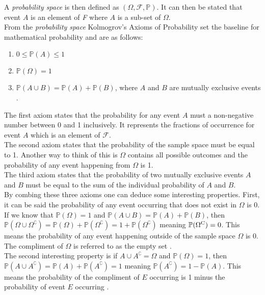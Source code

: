 \documentclass{article}
\begin{document}
A \textit{probability space} is then defined as $(\Omega, \mathcal{F}, \mathbb{P})$. It can then be stated that event $A$ is an element of \textit{F} where $A$ is a sub-set of $\Omega$. \\

From the \textit{probability space} Kolmogrov's Axioms of Probability set the baseline for mathematical probability and are as follows:

\begin{enumerate}
  \item $0 \leq \mathbb{P}(A) \leq 1$
  \item $\mathbb{P}(\Omega) = 1$
  \item $\mathbb{P}(A \cup B) = \mathbb{P}(A) + \mathbb{P}(B)$, where $A$ and $B$ are mutually exclusive events \parencite{Meyers2020}.
\end{enumerate}

The first axiom states that the probability for any event $A$ must a non-negative number between 0 and 1 inclusively. It represents the fractions of occurrence for event $A$ which is an element of $\mathcal{F}$. \\

The second axiom states that the probability of the sample space must be equal to 1. Another way to think of this is $\Omega$ contains all possible outcomes and the probability of any event happening from $\Omega$ is 1. \\

The third axiom states that the probability of two mutually exclusive events $A$ and $B$ must be equal to the sum of the individual probability of $A$ and $B$. \\

By combing these three axioms one can deduce some interesting properties. First, it can be said the probability of any event occurring that does not exist in $\Omega$ is 0. If we know that $\mathbb{P}(\Omega)=1$ and $\mathbb{P}(A \cup B) = \mathbb{P}(A) + \mathbb{P}(B)$, then $\mathbb{P}(\Omega \cup \Omega^\complement) = \mathbb{P}(\Omega) + \mathbb{P}(\Omega^\complement) =  1+\mathbb{P}(\Omega^\complement)$ meaning $\mathbb{P}(\Omega\textsuperscript{C})=0$. This means the probability of any event happening outside of the sample space $\Omega$ is 0. The compliment of $\Omega$ is referred to as the empty set \parencite{Taylor2019}. \\ 

The second interesting property is if $A \cup A^\complement = \Omega$ and $\mathbb{P}(\Omega)=1$, then $\mathbb{P}(A \cup A^\complement) =  \mathbb{P}(A) + \mathbb{P}(A^\complement) = 1$ meaning $\mathbb{P}(A^\complement) = 1 - \mathbb{P}(A)$. This means the probability of the compliment of $E$ occurring is 1 minus the probability of event $E$ occurring \parencite{Taylor2019}. \\
\end{document}
